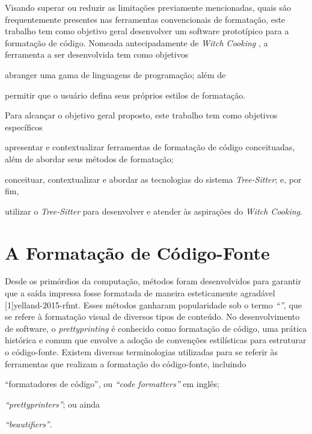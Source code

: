\documentclass
  [11pt, a4paper, english, openright, sumario = tradicional, twoside, brazil]
  {abntex2}
\newcommand{\treesitter}{\textit{Tree-Sitter}\xspace}
\newcommand{\witchcooking}{\textit{Witch Cooking}\xspace}
\begin{document}
  Visando superar ou reduzir as limitações previamente mencionadas, quais são
  frequentemente presentes nas ferramentas convencionais de formatação, este
  trabalho tem como objetivo geral desenvolver um software prototípico para a
  formatação de código. Nomeada antecipadamente de \witchcooking
  \cite{silva-2023-witch}, a ferramenta a ser desenvolvida tem como
  objetivos
  \begin{inparaenum}
    \item abranger uma gama de linguagens de programação; além de
    \item permitir que o usuário defina seus próprios estilos de formatação.
  \end{inparaenum}

  Para alcançar o objetivo geral proposto, este trabalho tem como objetivos
  específicos
  \begin{inparaenum}
    \item apresentar e contextualizar ferramentas de formatação de código
          conceituadas, além de abordar seus métodos de formatação;
    \item conceituar, contextualizar e abordar as tecnologias do sistema
          \treesitter; e, por fim,
    \item utilizar o \treesitter para desenvolver e atender às aspirações do
          \witchcooking.
  \end{inparaenum}


  \chapter{A Formatação de Código-Fonte}

  Desde os primórdios da computação, métodos foram desenvolvidos para garantir
  que a saída impressa fosse formatada de maneira esteticamente agradável
  [1]{yelland-2015-rfmt}. Esses métodos ganharam
  popularidade sob o termo \textit{``''}, que se refere à
  formatação visual de diversos tipos de conteúdo. No desenvolvimento de
  software, o \textit{prettyprinting} é conhecido como formatação de código,
  uma prática histórica e comum que envolve a adoção de convenções estilísticas
  para estruturar o código-fonte. Existem diversas terminologias utilizadas
  para se referir às ferramentas que realizam a formatação do código-fonte,
  incluindo
  \begin{inparaenum}
    \item ``formatadores de código'', ou \textit{``code formatters''} em
          inglês;
    \item \textit{``prettyprinters''}; ou ainda
    \item \textit{``beautifiers''}.
  \end{inparaenum}
\end{document}
